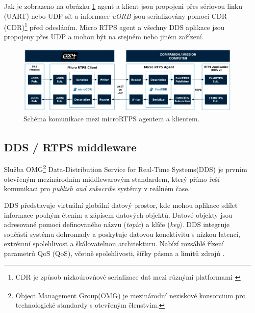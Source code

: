 Jak je zobrazeno na obrázku \ref{fig:RTPS_a_c} agent a klient jsou propojeni přes sériovou linku (UART) nebo UDP síť a informace \textit{uORB} jsou serializovány pomocí \acs{CDR} (\acl{CDR})\footnote{\acl{CDR} je způsob nízkoúrovňové serializace dat mezi různými platformami \cite{CDR}} před odesláním. Micro RTPS agent a všechny \acs{DDS} aplikace jsou propojeny přes UDP a mohou být na stejném nebo jiném zařízení.

\begin{figure}[!ht]
    \begin{center}
        \hspace*{-1cm}
        \includegraphics[scale=0.45]{obrazky/RTPS1}
    \end{center}
    \caption[Schéma komunikace mezi microRTPS agentem a klientem]{Schéma komunikace mezi microRTPS agentem a klientem. \cite{PX4docs}}
    \label{fig:RTPS_a_c}
\end{figure}

\subsection{DDS\texorpdfstring{\textsuperscript{\textregistered}}{ (R)} / RTPS middleware}

Služba OMG\footnote{Object Management Group\textsuperscript \textregistered (OMG\textsuperscript \textregistered) je mezinárodní neziskové konsorcium pro technologické standardy s otevřeným členstvím.} Data-Distribution Service for Real-Time Systems\textsuperscript \textregistered (\acs{DDS}) je prvním otevřeným mezinárodním middlewarovým standardem, který přímo řeší komunikaci pro \textit{publish and subscribe} systémy v reálném čase.

\acs{DDS} představuje virtuální globální datový prostor, kde mohou aplikace sdílet informace pouhým čtením a zápisem datových objektů. Datové objekty jsou adresované pomocí definovaného názvu (\textit{topic}) a klíče (\textit{key}). \acs{DDS} integruje součásti systému dohromady a poskytuje datovou konektivitu s nízkou latencí, extrémní spolehlivost a škálovatelnou architekturu. Nabízí rozsáhlé řízení parametrů \acs{QoS} (\acl{QoS}), včetně spolehlivosti, šířky pásma a limitů zdrojů \cite{DDS_Def}. 

